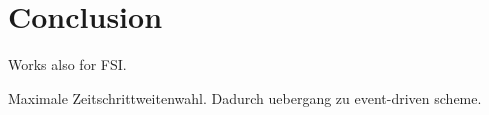 \section{Conclusion}
\label{section:conclusion}

Works also for FSI. 


Maximale Zeitschrittweitenwahl. Dadurch uebergang zu event-driven scheme.